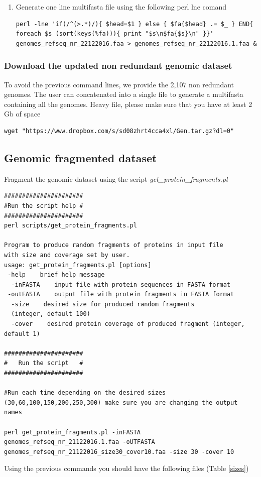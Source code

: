 \documentclass[12pt]{report}
\begin{document}
\begin{enumerate}
\item Generate one line multifasta file using the following perl lne comand
\begin{verbatim}
perl -lne 'if(/^(>.*)/){ $head=$1 } else { $fa{$head} .= $_ } END{ 
foreach $s (sort(keys(%fa))){ print "$s\n$fa{$s}\n" }}' 
genomes_refseq_nr_22122016.faa > genomes_refseq_nr_22122016.1.faa & 
\end{verbatim}
\end{enumerate}

\subsubsection{Download the updated non redundant genomic dataset}
To avoid the previous command lines, we  provide the 2,107 non redundant
genomes. The user can concatenated into a single file to generate a multifasta
containing all the genomes.  Heavy file, please make sure that you have at
least 2 Gb of space

\begin{verbatim}
wget "https://www.dropbox.com/s/sd08zhrt4cca4xl/Gen.tar.gz?dl=0"
\end{verbatim}


\subsection{Genomic fragmented dataset}

Fragment the genomic dataset using the script
\textit{get\_protein\_fragments.pl}

\begin{verbatim}
######################
#Run the script help #
######################
perl scripts/get_protein_fragments.pl 

Program to produce random fragments of proteins in input file 
with size and coverage set by user.
usage: get_protein_fragments.pl [options] 
 -help    brief help message
  -inFASTA    input file with protein sequences in FASTA format
 -outFASTA    output file with protein fragments in FASTA format
  -size    desired size for produced random fragments    
  (integer, default 100)
  -cover    desired protein coverage of produced fragment (integer, default 1) 

######################
#   Run the script   #
######################

#Run each time depending on the desired sizes 
(30,60,100,150,200,250,300) make sure you are changing the output names

perl get_protein_fragments.pl -inFASTA 
genomes_refseq_nr_21122016.1.faa -oUTFASTA 
genomes_refseq_nr_21122016_size30_cover10.faa -size 30 -cover 10 
\end{verbatim}
Using the previous commands you should have the following files (Table
\ref{sizes}) 
\end{document}
